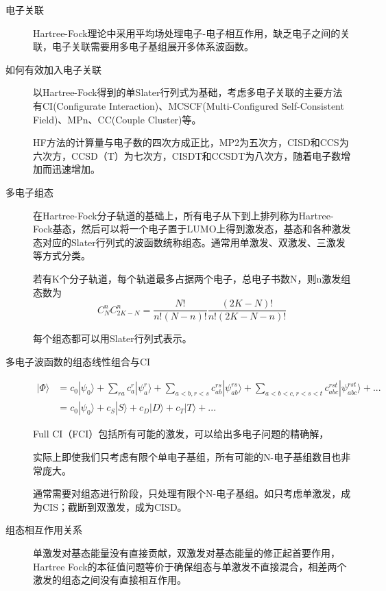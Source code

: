 \documentclass[12pt,a4paper,openany,twoside]{book}
\numberwithin{equation}{section}
\newcommand{\ket}[1]{| #1 \rangle}
\begin{document}
  \begin{description}
    \item[电子关联] Hartree-Fock理论中采用平均场处理电子-电子相互作用，缺乏电子之间的关联，电子关联需要用多电子基组展开多体系波函数。
  
    \item[如何有效加入电子关联] 以Hartree-Fock得到的单Slater行列式为基础，考虑多电子关联的主要方法有CI(Configurate Interaction)、MCSCF(Multi-Configured Self-Consistent Field)、MPn、CC(Couple Cluster)等。
  
    HF方法的计算量与电子数的四次方成正比，MP2为五次方，CISD和CCS为六次方，CCSD（T）为七次方，CISDT和CCSDT为八次方，随着电子数增加而迅速增加。
  
    \item[多电子组态] 在Hartree-Fock分子轨道的基础上，所有电子从下到上排列称为Hartree-Fock基态，然后可以将一个电子置于LUMO上得到激发态，基态和各种激发态对应的Slater行列式的波函数统称组态。通常用单激发、双激发、三激发等方式分类。
  
    若有K个分子轨道，每个轨道最多占据两个电子，总电子书数N，则n激发组态数为
    \begin{equation}
    C_N^nC_{2K-N}^n=\frac{N!}{n!(N-n)!}\frac{(2K-N)!}{n!(2K-N-n)!}
    \end{equation}
  
    每个组态都可以用Slater行列式表示。
  
  
    \item[多电子波函数的组态线性组合与CI]
    \begin{align*}
    \ket{\Phi} &= c_0\ket{\psi_0} +\sum_{ra}c_a^r\ket{\psi_a^r}+\sum_{a<b,r<s}c_{ab}^{rs}\ket{\psi_{ab}^{rs}}+\sum_{a<b<c,r<s<t}c^{rst}_{abc}\ket{\psi^{rst}_{abc}}+...\\
    &=c_0\ket{\psi_0} + c_S\ket{S}+c_D\ket{D}+c_T\ket{T}+...
    \end{align*}
  
    Full CI（FCI）包括所有可能的激发，可以给出多电子问题的精确解，
  
    实际上即使我们只考虑有限个单电子基组，所有可能的N-电子基组数目也非常庞大。
  
    通常需要对组态进行阶段，只处理有限个N-电子基组。如只考虑单激发，成为CIS；截断到双激发，成为CISD。
  
  
    \item[组态相互作用关系] 单激发对基态能量没有直接贡献，双激发对基态能量的修正起首要作用，Hartree Fock的本征值问题等价于确保组态与单激发不直接混合，相差两个激发的组态之间没有直接相互作用。
  

\end{description}
\end{document}
